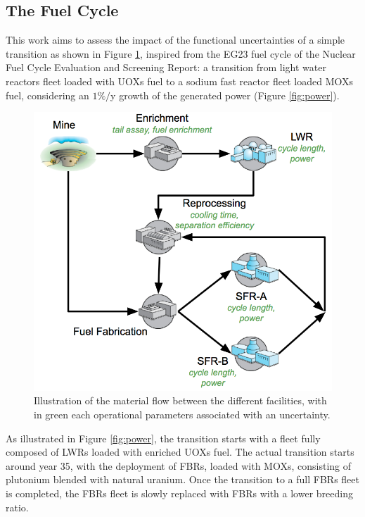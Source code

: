 \documentclass{anstrans}
\begin{document}
\subsection{The Fuel Cycle}
This work aims to assess the impact of the functional uncertainties of a
simple transition as shown in Figure \ref{fig:cycle}, inspired from the EG23 fuel cycle of the Nuclear Fuel Cycle Evaluation and Screening Report\cite{FCO}: a transition from light water reactors fleet loaded
with \glspl{UOX} fuel to a sodium fast reactor fleet loaded \glspl{MOX} fuel, considering an
$1\%/$y growth of the generated power (Figure \ref{fig:power}).
\begin{figure}[ht] %
  \centering
  \includegraphics[scale=0.31]{cycle.png}
  \caption{Illustration of the material flow between the different facilities,
  with in green each operational parameters associated with an
  uncertainty.}\label{fig:cycle}
\end{figure}

As illustrated in Figure \ref{fig:power}, the transition starts with a fleet
fully composed of \glspl{LWR} loaded with enriched \glspl{UOX} fuel. The actual
transition starts around year 35, with the deployment of \glspl{FBR}, loaded
with \glspl{MOX}, consisting of plutonium blended with natural
uranium. Once the transition to a full \glspl{FBR} fleet is completed, the
\glspl{FBR} fleet is slowly replaced with \glspl{FBR} with a lower breeding
ratio.
\end{document}
